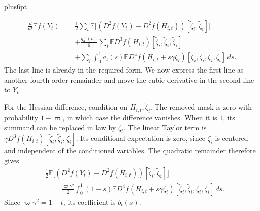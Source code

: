\documentclass[11pt,letterpaper,twoside,leqno]{article}
\makeatletter
\theoremstyle{bookplain}
\theoremstyle{bookremark}
\renewenvironment{proof}[1][\proofname]{\par
  \pushQED{\qed}\normalfont\topsep6pt plus6pt\relax
  \trivlist\item[\hskip\labelsep\bfseries #1\@addpunct{.}]\ignorespaces
}{\popQED\endtrivlist\@endpefalse}
\newcommand{\E}{\mathbb E}
\newcommand{\dd}{\,d}
\makeatother
\begin{document}
\begin{proof}
\begin{equation}
\begin{aligned}
 \frac{d}{dt}\E f(Y_t)
 ={}&\frac12\sum_i\E
       \bigl[(D^2f(Y_t)-D^2f(H_{i,t}))
             [\widetilde\zeta_i,\widetilde\zeta_i]\bigr]\\
 &+\frac{q_3'(t)}6\sum_i
       \E D^3f(H_{i,t})
              [\widetilde\zeta_i,\widetilde\zeta_i,
               \widetilde\zeta_i]\\
 &+\sum_i\int_0^1a_t(s)
       \E D^4f(H_{i,t}+s\gamma\zeta_i)
              [\zeta_i,\zeta_i,\zeta_i,\zeta_i]\dd s.
 \end{aligned}
 \label{appx-an:deleted-base-expansion}
\end{equation}
The last line is already in the required form. We now express
the first line as another fourth-order remainder and move the
cubic derivative in the second line to \(Y_t\).

For the Hessian difference, condition on
\(H_{i,t},\widetilde\zeta_i\). The removed mask is zero with
probability \(1-\varpi\), in which case the difference vanishes.
When it is \(1\), its summand can be replaced in law by \(\zeta_i\).
The linear Taylor term is
$\gamma D^3f(H_{i,t})[\widetilde\zeta_i,\widetilde\zeta_i,\zeta_i]$.
Its conditional expectation is zero, since $\zeta_i$ is centered
and independent of the conditioned variables. The quadratic
remainder therefore gives
\[
 \begin{aligned}
 &\frac12\E
    \bigl[(D^2f(Y_t)-D^2f(H_{i,t}))
                 [\widetilde\zeta_i,\widetilde\zeta_i]\bigr]\\
 &\quad=\frac{\varpi\gamma^2}{2}\int_0^1(1-s)
       \E D^4f(H_{i,t}+s\gamma\zeta_i)
           [\widetilde\zeta_i,\widetilde\zeta_i,
            \zeta_i,\zeta_i]\dd s.
 \end{aligned}
\]
Since \(\varpi\gamma^2=1-t\), its coefficient is \(b_t(s)\).


\end{proof}
\end{document}
